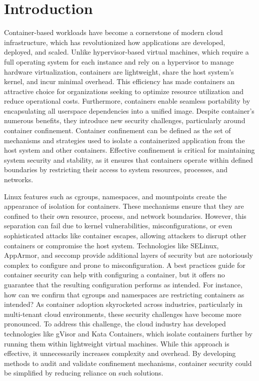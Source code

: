 \section{Introduction}

Container-based workloads have become a cornerstone of modern cloud infrastructure, which has revolutionized how applications are developed, deployed, and scaled. Unlike hypervisor-based virtual machines, which require a full operating system for each instance and rely on a hypervisor to manage hardware virtualization, containers are lightweight, share the host system’s kernel, and incur minimal overhead. This efficiency has made containers an attractive choice for organizations seeking to optimize resource utilization and reduce operational costs. Furthermore, containers enable seamless portability by encapsulating all userspace dependencies into a unified image. Despite container's numerous benefits, they introduce new security challenges, particularly around container confinement. Container confinement can be defined as the set of mechanisms and strategies used to isolate a containerized application from the host system and other containers. Effective confinement is critical for maintaining system security and stability, as it ensures that containers operate within defined boundaries by restricting their access to system resources, processes, and networks. 


Linux features such as cgroups, namespaces, and mountpoints create the appearance of isolation for containers. These mechanisms ensure that they are confined to their own resource, process, and network boundaries. However, this separation can fail due to kernel vulnerabilities, misconfigurations, or even sophisticated attacks like container escapes, allowing attackers to disrupt other containers or compromise the host system. Technologies like SELinux, AppArmor, and seccomp provide additional layers of security but are notoriously complex to configure and prone to misconfiguration. A best practices guide for container security  \cite{CIS} can help with configuring a container, but it offers no guarantee that the resulting configuration performs as intended. For instance, how can we confirm that cgroups and namespaces are restricting containers as intended? As container adoption skyrocketed across industries, particularly in multi-tenant cloud environments, these security challenges have become more pronounced. To address this challenge, the cloud industry has developed technologies like gVisor and Kata Containers, which isolate containers further by running them within lightweight virtual machines. While this approach is effective, it unnecessarily increases complexity and overhead. By developing methods to audit and validate confinement mechanisms, container security could be simplified by reducing reliance on such solutions.

